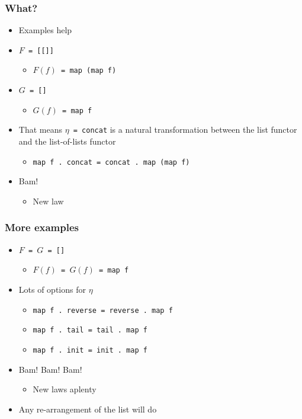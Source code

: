 \documentclass{beamer}
\begin{document}
\begin{frame}[fragile]
    \frametitle{What?}
\begin{itemize}
    \item Examples help
    \item $F$\verb? = [[]]?
        \begin{itemize}
            \item $F(f)$\verb? = map (map f)?
        \end{itemize}
    \item $G$\verb? = []?
        \begin{itemize}
            \item $G(f)$\verb? = map f?
        \end{itemize}
    \item That means $\eta$\verb? = concat? is a natural transformation between the list functor and the list-of-lists functor
        \begin{itemize}
            \item \verb?map f . concat = concat . map (map f)?
        \end{itemize}
    \item<2-> Bam!
        \begin{itemize}
            \item<3-> New law
        \end{itemize}
\end{itemize}
\end{frame}

\begin{frame}[fragile]
    \frametitle{More examples}
\begin{itemize}
    \item $F$\verb? = ?$G$\verb? = []?
        \begin{itemize}
            \item $F(f)$\verb? = ?$G(f)$\verb? = map f?
        \end{itemize}
    \item Lots of options for $\eta$
        \begin{itemize}
            \item \verb?map f . reverse = reverse . map f?
            \item \verb?map f . tail = tail . map f?
            \item \verb?map f . init = init . map f?
        \end{itemize}
    \item<2-> Bam! Bam! Bam!
        \begin{itemize}
            \item<3-> New laws aplenty
        \end{itemize}
    \item<4-> Any re-arrangement of the list will do
\end{itemize}
\end{frame}
\end{document}
